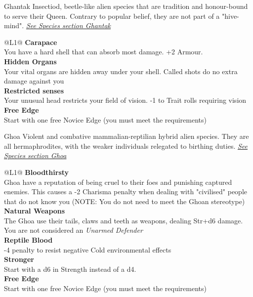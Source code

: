 \begin{genericsection}{Ghantak}
  Insectiod, beetle-like alien species that are tradition and honour-bound to serve their Queen. Contrary to popular belief, they are not part of a "hive-mind". \textit{\hyperref[sec:specie-ghantak]{See Species section Ghantak}}
\end{genericsection}
\begin{redtable}{\linewidth}{@{}L{1}@{}}
  \textbf{Carapace}\\
  You have a hard shell that can absorb most damage. +2 Armour.\\
  \textbf{Hidden Organs}\\
  Your vital organs are hidden away under your shell. Called shots do no extra damage against you\\
  \textbf{Restricted senses}\\
  Your unusual head restricts your field of vision. -1 to Trait rolls requiring vision\\
  \textbf{Free Edge}\\
  Start with one free Novice Edge (you must meet the requirements)\\
\end{redtable}
  
\begin{genericsection}{Ghoa}
  Violent and combative mammalian-reptilian hybrid alien species. They are all hermaphrodites, with the weaker individuals relegated to birthing duties. \textit{\hyperref[sec:specie-ghoa]{See Species section Ghoa}}
\end{genericsection}
\begin{redtable}{\linewidth}{@{}L{1}@{}}
  \textbf{Bloodthirsty}\\
  Ghoa have a reputation of being cruel to their foes and punishing captured enemies. This causes a -2 Charisma penalty when dealing with "civilised" people that do not know you (NOTE: You do not need to meet the Ghoan stereotype)\\
  \textbf{Natural Weapons}\\
  The Ghoa use their tails, claws and teeth as weapons, dealing Str+d6 damage. You are not considered an \textit{Unarmed Defender}\\
  \textbf{Reptile Blood}\\
  -4 penalty to resist negative Cold environmental effects\\
  \textbf{Stronger}\\
  Start with a d6 in Strength instead of a d4.\\
  \textbf{Free Edge}\\
  Start with one free Novice Edge (you must meet the requirements)\\
\end{redtable}
  
